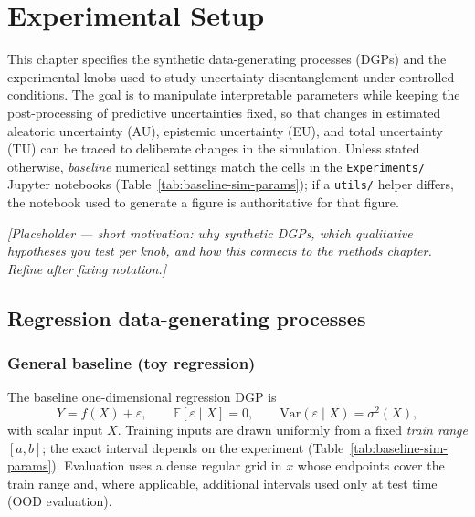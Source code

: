 
\chapter{Experimental Setup}
\label{ch:experimental-setup}

This chapter specifies the synthetic data-generating processes (DGPs) and the experimental knobs used to study uncertainty disentanglement under controlled conditions. The goal is to manipulate interpretable parameters while keeping the post-processing of predictive uncertainties fixed, so that changes in estimated aleatoric uncertainty (AU), epistemic uncertainty (EU), and total uncertainty (TU) can be traced to deliberate changes in the simulation. Unless stated otherwise, \emph{baseline} numerical settings match the cells in the \texttt{Experiments/} Jupyter notebooks (Table~\ref{tab:baseline-sim-params}); if a \texttt{utils/} helper differs, the notebook used to generate a figure is authoritative for that figure.

\textit{[Placeholder --- short motivation: why synthetic DGPs, which qualitative hypotheses you test per knob, and how this connects to the methods chapter. Refine after fixing notation.]}

\section{Regression data-generating processes}
\label{sec:regression-dgp}

\subsection{General baseline (toy regression)}
\label{sec:general-baseline-dgp}

The baseline one-dimensional regression DGP is
\begin{equation}
  Y = f(X) + \varepsilon,
  \qquad
  \mathbb{E}[\varepsilon \mid X] = 0,
  \qquad
  \mathrm{Var}(\varepsilon \mid X) = \sigma^2(X),
\end{equation}
with scalar input $X$. Training inputs are drawn uniformly from a fixed \emph{train range} $[a,b]$; the exact interval depends on the experiment (Table~\ref{tab:baseline-sim-params}). Evaluation uses a dense regular grid in $x$ whose endpoints cover the train range and, where applicable, additional intervals used only at test time (OOD evaluation).

